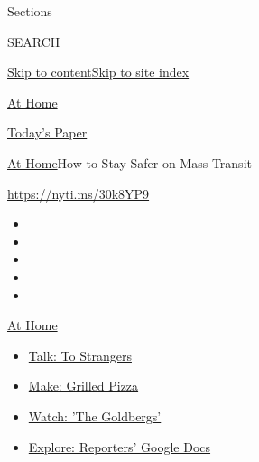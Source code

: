 Sections

SEARCH

\protect\hyperlink{site-content}{Skip to
content}\protect\hyperlink{site-index}{Skip to site index}

\href{https://www.nytimes3xbfgragh.onion/spotlight/at-home}{At Home}

\href{https://myaccount.nytimes3xbfgragh.onion/auth/login?response_type=cookie\&client_id=vi}{}

\href{https://www.nytimes3xbfgragh.onion/section/todayspaper}{Today's
Paper}

\href{/spotlight/at-home}{At Home}\textbar{}How to Stay Safer on Mass
Transit

\url{https://nyti.ms/30k8YP9}

\begin{itemize}
\item
\item
\item
\item
\item
\end{itemize}

\href{https://www.nytimes3xbfgragh.onion/spotlight/at-home?action=click\&pgtype=Article\&state=default\&region=TOP_BANNER\&context=at_home_menu}{At
Home}

\begin{itemize}
\tightlist
\item
  \href{https://www.nytimes3xbfgragh.onion/2020/08/03/well/family/the-benefits-of-talking-to-strangers.html?action=click\&pgtype=Article\&state=default\&region=TOP_BANNER\&context=at_home_menu}{Talk:
  To Strangers}
\item
  \href{https://www.nytimes3xbfgragh.onion/2020/08/01/at-home/coronavirus-make-pizza-on-a-grill.html?action=click\&pgtype=Article\&state=default\&region=TOP_BANNER\&context=at_home_menu}{Make:
  Grilled Pizza}
\item
  \href{https://www.nytimes3xbfgragh.onion/2020/07/31/arts/television/goldbergs-abc-stream.html?action=click\&pgtype=Article\&state=default\&region=TOP_BANNER\&context=at_home_menu}{Watch:
  'The Goldbergs'}
\item
  \href{https://www.nytimes3xbfgragh.onion/interactive/2020/at-home/even-more-reporters-editors-diaries-lists-recommendations.html?action=click\&pgtype=Article\&state=default\&region=TOP_BANNER\&context=at_home_menu}{Explore:
  Reporters' Google Docs}
\end{itemize}

